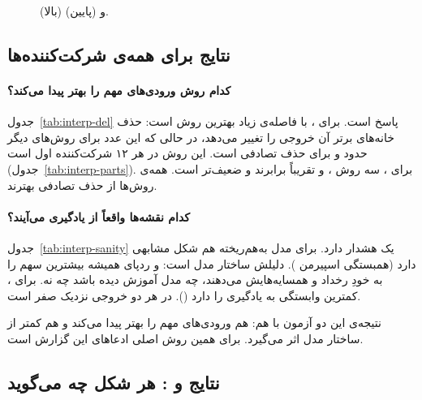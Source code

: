 \begin{figure}[htbp]
\centering

\caption{ (بالا) و  (پایین).}
\end{figure}

\subsection{نتایج برای همه‌ی شرکت‌کننده‌ها}

\paragraph{کدام روش ورودی‌های مهم را بهتر پیدا می‌کند؟} جدول~\ref{tab:interp-del} پاسخ  است. برای ،  با فاصله‌ی زیاد بهترین روش است: حذف خانه‌های برتر آن خروجی را  تغییر می‌دهد، در حالی که این عدد برای روش‌های دیگر حدود  و برای حذف تصادفی  است. این روش در هر ۱۲ شرکت‌کننده اول است (جدول~\ref{tab:interp-parts}). برای ، سه روش ،  و  تقریباً برابرند و  ضعیف‌تر است. همه‌ی روش‌ها از حذف تصادفی بهترند.



\paragraph{کدام نقشه‌ها واقعاً از یادگیری می‌آیند؟} جدول~\ref{tab:interp-sanity} یک هشدار دارد.   برای مدل به‌هم‌ریخته هم شکل مشابهی دارد (همبستگی اسپیرمن ). دلیلش ساختار مدل است:  و ردپای  همیشه بیشترین سهم را به  خودِ رخداد و همسایه‌هایش می‌دهند، چه مدل آموزش دیده باشد چه نه. برای ،  کمترین وابستگی به یادگیری را دارد ().  در هر دو خروجی نزدیک صفر است.

نتیجه‌ی این دو آزمون با هم:  هم ورودی‌های مهم را بهتر پیدا می‌کند و هم کمتر از ساختار مدل اثر می‌گیرد. برای همین روش اصلی ادعاهای این گزارش است.




\subsection{نتایج  و : هر شکل چه می‌گوید}
\label{sec:interp-figs}

